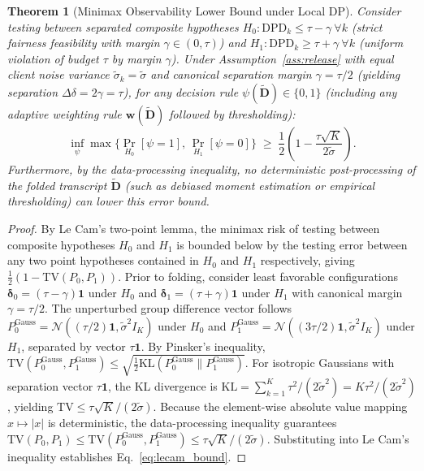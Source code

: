 \documentclass[preprint,12pt]{elsarticle}
\theoremstyle{plain}
\newtheorem{theorem}{Theorem}
\theoremstyle{definition}
\theoremstyle{remark}
\newcommand{\dpd}{\mathrm{DPD}}
\begin{document}
\begin{theorem}[Minimax Observability Lower Bound under Local DP]\label{thm:observability}
Consider testing between separated composite hypotheses $H_0: \dpd_k \le \tau - \gamma\ \forall k$ (strict fairness feasibility with margin $\gamma \in (0, \tau)$) and $H_1: \dpd_k \ge \tau + \gamma\ \forall k$ (uniform violation of budget $\tau$ by margin $\gamma$). Under Assumption~\ref{ass:release} with equal client noise variance $\tilde\sigma_k = \tilde\sigma$ and canonical separation margin $\gamma = \tau/2$ (yielding separation $\Delta\delta = 2\gamma = \tau$), for \emph{any} decision rule $\psi(\widetilde{\bm{D}}) \in \{0,1\}$ (including any adaptive weighting rule $\bm{w}(\widetilde{\bm{D}})$ followed by thresholding):
\begin{equation}
\inf_\psi \max\big\{\Pr_{H_0}[\psi=1],\,\Pr_{H_1}[\psi=0]\big\} \;\ge\; \frac{1}{2}\left(1 - \frac{\tau\sqrt{K}}{2\tilde\sigma}\right).
\label{eq:lecam_bound}
\end{equation}
Furthermore, by the data-processing inequality, no deterministic post-processing of the folded transcript $\widetilde{\bm{D}}$ (such as debiased moment estimation or empirical thresholding) can lower this error bound.
\end{theorem}

\begin{proof}
By Le Cam's two-point lemma, the minimax risk of testing between composite hypotheses $H_0$ and $H_1$ is bounded below by the testing error between any two point hypotheses contained in $H_0$ and $H_1$ respectively, giving $\frac{1}{2}(1 - \mathrm{TV}(P_0, P_1))$. Prior to folding, consider least favorable configurations $\bm{\delta}_0 = (\tau-\gamma)\bm{1}$ under $H_0$ and $\bm{\delta}_1 = (\tau+\gamma)\bm{1}$ under $H_1$ with canonical margin $\gamma = \tau/2$. The unperturbed group difference vector follows $P_0^{\text{Gauss}} = \mathcal{N}((\tau/2)\bm{1}, \tilde\sigma^2 I_K)$ under $H_0$ and $P_1^{\text{Gauss}} = \mathcal{N}((3\tau/2)\bm{1}, \tilde\sigma^2 I_K)$ under $H_1$, separated by vector $\tau\bm{1}$. By Pinsker's inequality, $\mathrm{TV}(P_0^{\text{Gauss}}, P_1^{\text{Gauss}}) \le \sqrt{\frac{1}{2}\mathrm{KL}(P_0^{\text{Gauss}} \parallel P_1^{\text{Gauss}})}$. For isotropic Gaussians with separation vector $\tau\bm{1}$, the KL divergence is $\mathrm{KL} = \sum_{k=1}^K \tau^2 / (2\tilde\sigma^2) = K\tau^2 / (2\tilde\sigma^2)$, yielding $\mathrm{TV} \le \tau\sqrt{K}/(2\tilde\sigma)$. Because the element-wise absolute value mapping $x \mapsto |x|$ is deterministic, the data-processing inequality guarantees $\mathrm{TV}(P_0, P_1) \le \mathrm{TV}(P_0^{\text{Gauss}}, P_1^{\text{Gauss}}) \le \tau\sqrt{K}/(2\tilde\sigma)$. Substituting into Le Cam's inequality establishes Eq.~\eqref{eq:lecam_bound}.
\end{proof}
\end{document}

